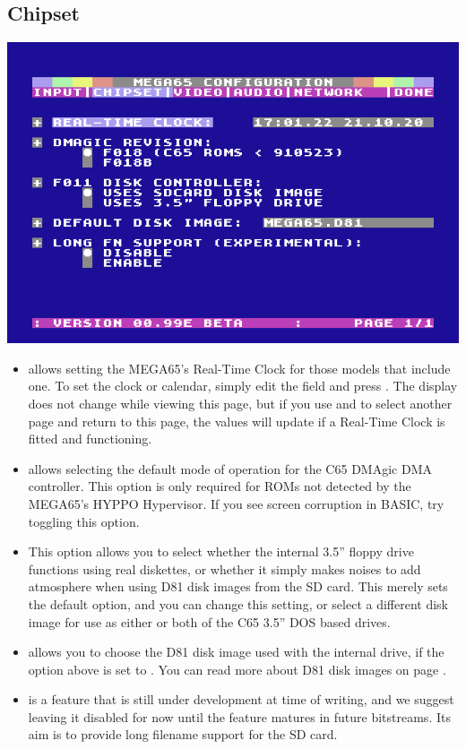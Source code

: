 \subsection{Chipset}
\label{configuring-chipset}
\begin{center}
\includegraphics[width=0.7\linewidth]{images/ss-m65config-2.png}
\end{center}
\begin{itemize}
  \item {} allows setting the MEGA65's Real-Time
    Clock for those models that include one.  To set the clock or
    calendar, simply edit the field and press .
    The display does not change while viewing this page, but if
    you use \megakey{$\leftarrow$} and \megakey{$\rightarrow$} to select another page and
    return to this page, the values will update if a Real-Time Clock
    is fitted and functioning.
  \item {} allows selecting the default mode of
    operation for the C65 DMAgic DMA controller.  This option is only
    required for ROMs not detected by the MEGA65's HYPPO Hypervisor.
    If you see screen corruption in BASIC,
    try toggling this option.
  \item {}
    This option allows you to select whether the internal 3.5'' floppy
    drive functions using real diskettes, or whether it simply makes
    noises to add atmosphere when using D81 disk images from the SD
    card.  This merely sets the default option, and you can change
    this setting, or select a different disk image for use as either
    or both of the C65 3.5'' DOS based drives.
  \item {} allows you to choose the D81 disk image
    used with the internal drive, if the 
    option above is set to . You can read more about
    D81 disk images on page \pageref{sec:d81-images}.
  \item {} is a feature that is still under development
    at time of writing, and we suggest leaving it disabled for now until the feature
    matures in future bitstreams. Its aim is to provide long filename support for the
    SD card.
\end{itemize}


